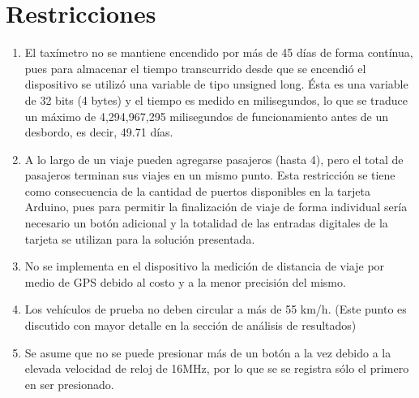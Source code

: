 \documentclass[a4paper,11pt]{article}
\begin{document}
 \section*{Restricciones}
 \begin{enumerate}
	\item El taxímetro no se mantiene encendido por más de 45 días de forma contínua, pues para almacenar el tiempo transcurrido desde que se encendió el dispositivo se utilizó una variable de tipo unsigned long. Ésta es una variable de 32 bits (4 bytes) y el tiempo es medido en milisegundos, 
	lo que se traduce un máximo de 4,294,967,295 milisegundos de funcionamiento antes de un desbordo, es decir, 49.71 días.
	\item A lo largo de un viaje pueden agregarse pasajeros (hasta 4), pero el total de pasajeros terminan sus viajes en un mismo punto. Esta restricción se tiene como consecuencia de la cantidad de puertos disponibles en la tarjeta Arduino, pues para permitir la finalización de viaje de forma individual sería necesario un botón adicional y la totalidad de las entradas digitales de la tarjeta se utilizan para la solución presentada. 
	\item No se implementa en el dispositivo la medición de distancia de viaje por medio de GPS debido al costo y a la menor precisión del mismo.
	\item Los vehículos de prueba no deben circular a más de 55 km/h. (Este punto es discutido con mayor detalle en la sección de análisis de resultados)
	\item Se asume que no se puede presionar más de un botón a la vez debido a la elevada velocidad de reloj de 16MHz, por lo que se se registra sólo el primero en ser presionado.
\end{enumerate}

\newpage
\end{document}
